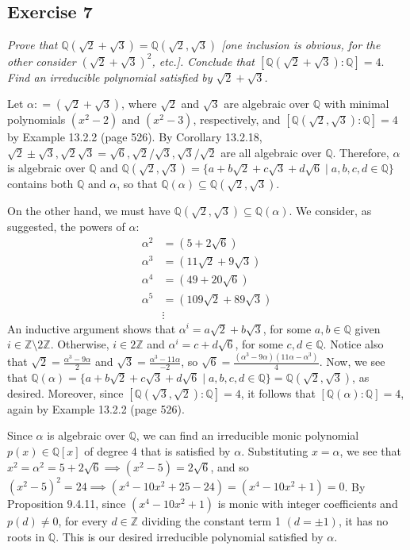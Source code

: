 \subsection*{Exercise 7}
\begin{framed}
\textit{Prove that $\mathbb{Q}(\sqrt{2} + \sqrt{3}) = \mathbb{Q}(\sqrt{2}, \sqrt{3})$ [one inclusion is obvious, for the other consider $(\sqrt{2} + \sqrt{3})^2$, etc.]. Conclude that $[\mathbb{Q}(\sqrt{2} + \sqrt{3}): \mathbb{Q}] = 4.$ Find an irreducible polynomial satisfied by $\sqrt{2} + \sqrt{3}$.}
\end{framed}

Let $\alpha: = (\sqrt{2} + \sqrt{3})$, where $\sqrt{2}$ and $\sqrt{3}$ are algebraic over $\mathbb{Q}$ with minimal polynomials $(x^2 - 2)$ and $(x^2 - 3)$, respectively, and $[\mathbb{Q}(\sqrt{2}, \sqrt{3}): \mathbb{Q}] = 4$ by Example 13.2.2 (page 526). By Corollary 13.2.18, $\sqrt{2}\pm\sqrt{3}, \sqrt{2}\sqrt{3} = \sqrt{6}, \sqrt{2}/\sqrt{3}, \sqrt{3}/\sqrt{2}$ are all algebraic over $\mathbb{Q}$. Therefore, $\alpha$ is algebraic over $\mathbb{Q}$ and $\mathbb{Q}(\sqrt{2}, \sqrt{3}) = \{a + b\sqrt{2} + c\sqrt{3} + d\sqrt{6} \mid a, b, c, d \in \mathbb{Q}\}$ contains both $\mathbb{Q}$ and $\alpha$, so that $\mathbb{Q}(\alpha) \subseteq \mathbb{Q}(\sqrt{2}, \sqrt{3})$.

On the other hand, we must have $\mathbb{Q}(\sqrt{2}, \sqrt{3}) \subseteq \mathbb{Q}(\alpha)$. We consider, as suggested, the powers of $\alpha:$
\begin{align*}
    \alpha^2 &= (5 + 2\sqrt{6}) \\
    \alpha^3 &= (11\sqrt{2} + 9\sqrt{3}) \\
    \alpha^4 &= (49 + 20\sqrt{6}) \\
    \alpha^5 &= (109\sqrt{2} + 89\sqrt{3}) \\
    &\vdots
\end{align*}
An inductive argument shows that $\alpha^i = a\sqrt{2} + b\sqrt{3}$, for some $a, b \in \mathbb{Q}$ given $i \in \mathbb{Z}\setminus2\mathbb{Z}$. Otherwise, $i \in 2\mathbb{Z}$ and $\alpha^i = c + d\sqrt{6}$, for some $c, d \in \mathbb{Q}$. Notice also that $\sqrt{2} = \frac{\alpha^3 - 9\alpha}{2}$ and $\sqrt{3} = \frac{\alpha^3 - 11\alpha}{-2}$, so $\sqrt{6} = \frac{(\alpha^3 - 9\alpha)(11\alpha - \alpha^3)}{4}$. Now, we see that $\mathbb{Q}(\alpha) = \{a + b\sqrt{2} + c\sqrt{3} + d\sqrt{6} \mid a, b, c, d \in \mathbb{Q}\} = \mathbb{Q}(\sqrt{2}, \sqrt{3})$, as desired. Moreover, since $[\mathbb{Q}(\sqrt{3}, \sqrt{2}): \mathbb{Q}] = 4$, it follows that $[\mathbb{Q}(\alpha): \mathbb{Q}] = 4$, again by Example 13.2.2 (page 526).

Since $\alpha$ is algebraic over $\mathbb{Q}$, we can find an irreducible monic polynomial $p(x) \in \mathbb{Q}[x]$ of degree 4 that is satisfied by $\alpha$. Substituting $x = \alpha$, we see that $x^2 = \alpha^2 = 5 + 2\sqrt{6} \implies (x^2 - 5) = 2\sqrt{6}$, and so $(x^2 - 5)^2 = 24 \implies (x^4 - 10x^2 + 25 - 24) = (x^4 - 10x^2 + 1) = 0$. By Proposition 9.4.11, since $(x^4 - 10x^2 + 1)$ is monic with integer coefficients and $p(d) \not= 0$, for every $d \in \mathbb{Z}$ dividing the constant term 1 $(d = \pm 1)$, it has no roots in $\mathbb{Q}$. This is our desired irreducible polynomial satisfied by $\alpha$.